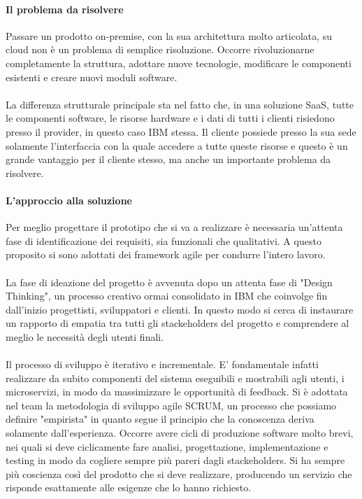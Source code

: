 \paragraph{Il problema da risolvere}
Passare un prodotto on-premise, con la sua architettura molto articolata, su cloud non è un problema di semplice risoluzione. Occorre rivoluzionarne completamente la struttura, adottare nuove tecnologie, modificare le componenti esistenti e creare nuovi moduli software. 

\paragraph{}
La differenza strutturale principale sta nel fatto che, in una soluzione SaaS, tutte le componenti software, le risorse hardware e i dati di tutti i clienti risiedono presso il provider, in questo caso IBM stessa. Il cliente possiede presso la sua sede solamente l'interfaccia con la quale accedere a tutte queste risorse e questo è un grande vantaggio per il cliente stesso, ma anche un importante problema da risolvere. 

\paragraph{L'approccio alla soluzione}
Per meglio progettare il prototipo che si va a realizzare è necessaria un'attenta fase di identificazione dei requisiti, sia funzionali che qualitativi. A questo proposito si sono adottati dei framework agile per condurre l'intero lavoro. 
\paragraph{}
La fase di ideazione del progetto è avvenuta dopo un attenta fase di "Design Thinking", un processo creativo ormai consolidato in IBM che coinvolge fin dall'inizio progettisti, sviluppatori e clienti. In questo modo si cerca di instaurare un rapporto di empatia tra tutti gli stackeholders del progetto e comprendere al meglio le necessità degli utenti finali.
\paragraph{}
Il processo di sviluppo è iterativo e incrementale. E' fondamentale infatti realizzare da subito componenti del sistema eseguibili e mostrabili agli utenti, i microservizi, in modo da massimizzare le opportunità di feedback. Si è adottata nel team la metodologia di sviluppo agile SCRUM, un processo che possiamo definire "empirista" in quanto segue il principio che la conoscenza deriva solamente dall'esperienza. Occorre avere cicli di produzione software molto brevi, nei quali si deve ciclicamente fare analisi, progettazione, implementazione e testing in modo da cogliere sempre più pareri dagli stackeholders. Si ha sempre più coscienza così del prodotto che si deve realizzare, producendo un servizio che risponde esattamente alle esigenze che lo hanno richiesto.

